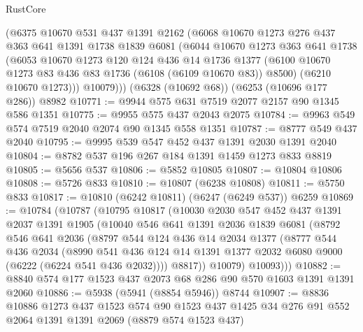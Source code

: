 \begin{lexlean}{RustCore}
\begin{coremodule}
      (@6375
        @10670
        @531
        @437
        @1391
        @2162
        (@6068
          @10670
          @1273
          @276
          @437
          @363
          @641
          @1391
          @1738
          @1839
          @6081
          (@6044
            @10670
            @1273
            @363
            @641
            @1738
            (@6053
              @10670
              @1273
              @120
              @124
              @436
              @14
              @1736
              @1377
              (@6100 @10670 @1273 @83 @436 @83 @1736 (@6108 (@6109 @10670 @83)) @8500)
              (@6210 @10670 @1273)))
          @10079)))
    (@6328 (@10692 @68))
    (@6253 (@10696 @177 @286))
    @8982
@10771 := @9944 @575 @631 @7519 @2077 @2157 @90 @1345 @586 @1351
@10775 := @9955 @575 @437 @2043 @2075
@10784 := @9963 @549 @574 @7519 @2040 @2074 @90 @1345 @558 @1351
@10787 := @8777 @549 @437 @2040
@10795 := @9995 @539 @547 @452 @437 @1391 @2030 @1391 @2040
@10804 := @8782 @537 @196 @267 @184 @1391 @1459 @1273 @833 @8819
@10805 := @5656 @537
@10806 := @5852 @10805
@10807 := @10804 @10806
@10808 := @5726 @833
@10810 := @10807 (@6238 @10808)
@10811 := @5750 @833
@10817 := @10810 (@6242 @10811) (@6247 (@6249 @537)) @6259
@10869 := @10784
    (@10787
      (@10795
        @10817
        (@10030
          @2030
          @547
          @452
          @437
          @1391
          @2037
          @1391
          @1905
          (@10040
            @546
            @641
            @1391
            @2036
            @1839
            @6081
            (@8792
              @546
              @641
              @2036
              (@8797
                @544
                @124
                @436
                @14
                @2034
                @1377
                (@8777
                  @544
                  @436
                  @2034
                  (@8990
                    @541
                    @436
                    @124
                    @14
                    @1391
                    @1377
                    @2032
                    @6080
                    @9000
                    (@6222 (@6224 @541 @436 @2032))))
                @8817))
            @10079)
          @10093)))
@10882 := @8840 @574 @177 @1523 @437 @2073 @68 @286 @90 @570 @1603 @1391 @1391 @2060
@10886 := @5938 (@5941 (@8854 @5946)) @8744
@10907 := @8836
    @10886
    @1273
    @437
    @1523
    @574
    @90
    @1523
    @437
    @1425
    @34
    @276
    @91
    @552
    @2064
    @1391
    @1391
    @2069
    (@8879 @574 @1523 @437)

\end{coremodule}
\end{lexlean}
